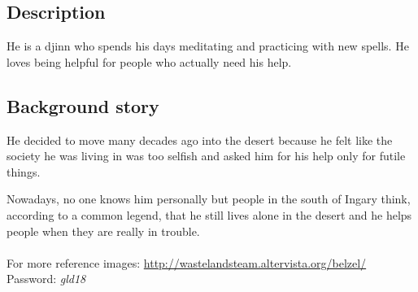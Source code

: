 \subsection{Description}
He is a djinn who spends his days meditating and practicing with new spells. He loves being helpful for people who actually need his help.

\subsection{Background story}
He decided to move many decades ago into the desert because he felt like the society he was living in was too selfish and asked him for his help only for futile things.

Nowadays, no one knows him personally but people in the south of Ingary think, according to a common legend, that he still lives alone in the desert and he helps people when they are really in trouble.\\\\
For more reference images: \url{http://wastelandsteam.altervista.org/belzel/}\\
Password: \textit{gld18}
